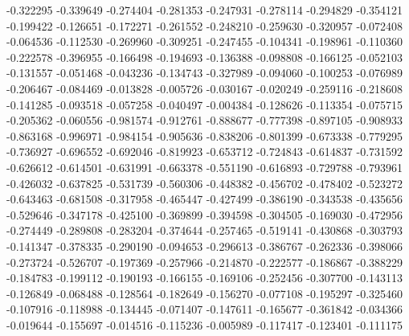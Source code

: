 -0.322295
-0.339649
-0.274404
-0.281353
-0.247931
-0.278114
-0.294829
-0.354121
-0.199422
-0.126651
-0.172271
-0.261552
-0.248210
-0.259630
-0.320957
-0.072408
-0.064536
-0.112530
-0.269960
-0.309251
-0.247455
-0.104341
-0.198961
-0.110360
-0.222578
-0.396955
-0.166498
-0.194693
-0.136388
-0.098808
-0.166125
-0.052103
-0.131557
-0.051468
-0.043236
-0.134743
-0.327989
-0.094060
-0.100253
-0.076989
-0.206467
-0.084469
-0.013828
-0.005726
-0.030167
-0.020249
-0.259116
-0.218608
-0.141285
-0.093518
-0.057258
-0.040497
-0.004384
-0.128626
-0.113354
-0.075715
-0.205362
-0.060556
-0.981574
-0.912761
-0.888677
-0.777398
-0.897105
-0.908933
-0.863168
-0.996971
-0.984154
-0.905636
-0.838206
-0.801399
-0.673338
-0.779295
-0.736927
-0.696552
-0.692046
-0.819923
-0.653712
-0.724843
-0.614837
-0.731592
-0.626612
-0.614501
-0.631991
-0.663378
-0.551190
-0.616893
-0.729788
-0.793961
-0.426032
-0.637825
-0.531739
-0.560306
-0.448382
-0.456702
-0.478402
-0.523272
-0.643463
-0.681508
-0.317958
-0.465447
-0.427499
-0.386190
-0.343538
-0.435656
-0.529646
-0.347178
-0.425100
-0.369899
-0.394598
-0.304505
-0.169030
-0.472956
-0.274449
-0.289808
-0.283204
-0.374644
-0.257465
-0.519141
-0.430868
-0.303793
-0.141347
-0.378335
-0.290190
-0.094653
-0.296613
-0.386767
-0.262336
-0.398066
-0.273724
-0.526707
-0.197369
-0.257966
-0.214870
-0.222577
-0.186867
-0.388229
-0.184783
-0.199112
-0.190193
-0.166155
-0.169106
-0.252456
-0.307700
-0.143113
-0.126849
-0.068488
-0.128564
-0.182649
-0.156270
-0.077108
-0.195297
-0.325460
-0.107916
-0.118988
-0.134445
-0.071407
-0.147611
-0.165677
-0.361842
-0.034366
-0.019644
-0.155697
-0.014516
-0.115236
-0.005989
-0.117417
-0.123401
-0.111175
